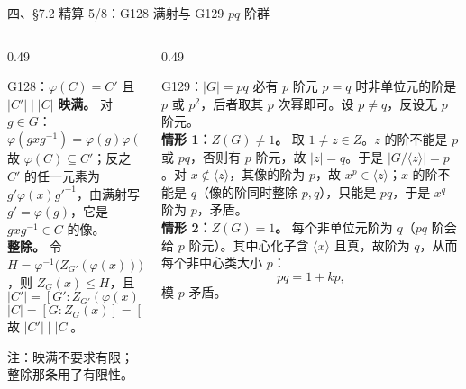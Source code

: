 \documentclass[aspectratio=169,10pt,fontset=none]{ctexbeamer}
\begin{document}
\begin{frame}[t]{四、\S7.2 精算 5/8：G128 满射与 G129 $pq$ 阶群}
  \begin{columns}[T,onlytextwidth]
    \begin{column}{0.49\textwidth}
      \begin{block}{\footnotesize G128：$\varphi(C)=C'$ 且 $|C'|\mid|C|$}
        \scriptsize
        \textbf{映满。} 对 $g\in G$：
        \[ \varphi(gxg^{-1})=\varphi(g)\varphi(x)\varphi(g)^{-1}, \]
        故 $\varphi(C)\subseteq C'$；反之 $C'$ 的任一元素为 $g'\varphi(x)g'^{-1}$，由满射写 $g'=\varphi(g)$，它是 $gxg^{-1}\in C$ 的像。\\
        \textbf{整除。} 令 $H=\varphi^{-1}\bigl(Z_{G'}(\varphi(x))\bigr)$，则 $Z_G(x)\le H$，且
        \[ |C'|=[G':Z_{G'}(\varphi(x))]=[G:H], \]
        \[ |C|=[G:Z_G(x)]=[G:H]\,[H:Z_G(x)], \]
        故 $|C'|\mid|C|$。
      \end{block}
      \footnotesize\color{ink!80}
      注：映满不要求有限；整除那条用了有限性。
    \end{column}
    \begin{column}{0.49\textwidth}
      \begin{alertblock}{\footnotesize G129：$|G|=pq$ 必有 $p$ 阶元}
        \scriptsize
        $p=q$ 时非单位元的阶是 $p$ 或 $p^2$，后者取其 $p$ 次幂即可。设 $p\ne q$，反设无 $p$ 阶元。\\[1pt]
        \textbf{情形 1：$Z(G)\ne1$。} 取 $1\ne z\in Z$。$z$ 的阶不能是 $p$ 或 $pq$，否则有 $p$ 阶元，故 $|z|=q$。于是 $|G/\langle z\rangle|=p$。对 $x\notin\langle z\rangle$，其像的阶为 $p$，故 $x^p\in\langle z\rangle$；$x$ 的阶不能是 $q$（像的阶同时整除 $p,q$），只能是 $pq$，于是 $x^q$ 阶为 $p$，矛盾。\\[1pt]
        \textbf{情形 2：$Z(G)=1$。} 每个非单位元阶为 $q$（$pq$ 阶会给 $p$ 阶元）。其中心化子含 $\langle x\rangle$ 且真，故阶为 $q$，从而每个非中心类大小 $p$：
        \[ pq=1+kp, \]
        模 $p$ 矛盾。
      \end{alertblock}
    \end{column}
  \end{columns}
\end{frame}
\end{document}
